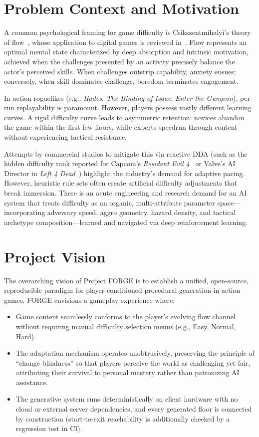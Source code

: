 \section{Problem Context and Motivation}
A common psychological framing for game difficulty is Csikszentmihalyi's theory of flow~\cite{csikszentmihalyi1990flow}, whose application to digital games is reviewed in~\cite{michailidis2018flow}. Flow represents an optimal mental state characterized by deep absorption and intrinsic motivation, achieved when the challenges presented by an activity precisely balance the actor's perceived skills. When challenges outstrip capability, anxiety ensues; conversely, when skill dominates challenge, boredom terminates engagement.

In action roguelikes (e.g., \textit{Hades}, \textit{The Binding of Isaac}, \textit{Enter the Gungeon}), per-run replayability is paramount. However, players possess vastly different learning curves. A rigid difficulty curve leads to asymmetric retention: novices abandon the game within the first few floors, while experts speedrun through content without experiencing tactical resistance. 

Attempts by commercial studios to mitigate this via reactive DDA (such as the hidden difficulty rank reported for Capcom's \textit{Resident Evil 4}~\cite{engadget2015re4} or Valve's AI Director in \textit{Left 4 Dead}~\cite{booth2009l4d}) highlight the industry's demand for adaptive pacing. However, heuristic rule sets often create artificial difficulty adjustments that break immersion. There is an acute engineering and research demand for an AI system that treats difficulty as an organic, multi-attribute parameter space—incorporating adversary speed, aggro geometry, hazard density, and tactical archetype composition—learned and navigated via deep reinforcement learning.

\section{Project Vision}
The overarching vision of Project FORGE is to establish a unified, open-source, reproducible paradigm for player-conditioned procedural generation in action games. FORGE envisions a gameplay experience where:
\begin{itemize}
    \item Game content seamlessly conforms to the player's evolving flow channel without requiring manual difficulty selection menus (e.g., Easy, Normal, Hard).
    \item The adaptation mechanism operates unobtrusively, preserving the principle of ``change blindness'' so that players perceive the world as challenging yet fair, attributing their survival to personal mastery rather than patronizing AI assistance.
    \item The generative system runs deterministically on client hardware with no cloud or external server dependencies, and every generated floor is connected by construction (start-to-exit reachability is additionally checked by a regression test in CI).
\end{itemize}

